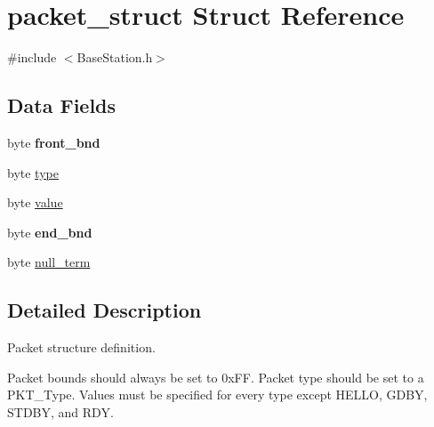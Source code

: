 \hypertarget{structpacket__struct}{\section{packet\-\_\-struct \-Struct \-Reference}
\label{structpacket__struct}
}


{\ttfamily \#include $<$\-Base\-Station.\-h$>$}

\subsection*{\-Data \-Fields}
\begin{DoxyCompactItemize}
\item 
\hypertarget{structpacket__struct_a955dcaa9b04b3f2fe476a34ceb17c404}{byte {\bfseries front\-\_\-bnd}}\label{structpacket__struct_a955dcaa9b04b3f2fe476a34ceb17c404}

\item 
byte \hyperlink{structpacket__struct_a0c99ddd42751de2947657294da9ea03b}{type}
\item 
byte \hyperlink{structpacket__struct_a08939832a1beaf4beda91d0d2e084d41}{value}
\item 
\hypertarget{structpacket__struct_ac6a5a443447f01d023101a9e05b83a13}{byte {\bfseries end\-\_\-bnd}}\label{structpacket__struct_ac6a5a443447f01d023101a9e05b83a13}

\item 
byte \hyperlink{structpacket__struct_a186f2116990358664c9b0db168d03265}{null\-\_\-term}
\end{DoxyCompactItemize}


\subsection{\-Detailed \-Description}
\-Packet structure definition.

\-Packet bounds should always be set to 0x\-F\-F. \-Packet type should be set to a \-P\-K\-T\-\_\-\-Type. \-Values must be specified for every type except \-H\-E\-L\-L\-O, \-G\-D\-B\-Y, \-S\-T\-D\-B\-Y, and \-R\-D\-Y. 

